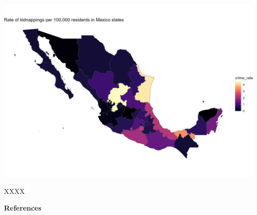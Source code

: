 \documentclass[
]{article}
\begin{document}
\includegraphics[width=41.67in]{exemplar-activities/Mexico_map}

XXXX

\textbf{References}
\end{document}
